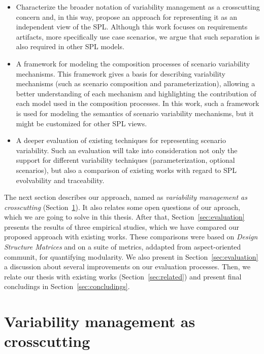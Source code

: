 \documentclass[times, 11pt,twocolumn]{article}
\begin{document}
\begin{itemize}
 \item Characterize the broader notation of variability management as
a crosscutting concern and, in this way, propose an approach for
representing it as an independent view of the SPL. Although
this work focuses on requirements artifacts, more specifically
use case scenarios, we argue that such separation is also required
in other SPL models.
 \item A framework for modeling the composition processes of scenario
variability mechanisms. This framework gives a basis for
describing variability mechanisms (such as scenario composition
and parameterization), allowing a better understanding of each mechanism and
highlighting the contribution of each model used in the composition processes.
In this work, such a framework is used for modeling the semantics of scenario variability mechanisms, but it
might be customized for other SPL views.
 \item A deeper evaluation of existing techniques for representing scenario
 variability. Such an evaluation will take into consideration not only the
 support for different variability techniques (parameterization, optional
 scenarios), but also a comparison of existing works with regard to
 SPL evolvability and traceability.  
\end{itemize}

The next section describes our approach, named as \emph{variability management
as crosscutting} (Section~\ref{sec:vmcc}). It also relates some open questions
of our aproach, which we are going to solve in this thesis. After that,
Section~\ref{sec:evaluation} presents the results of three empirical studies,
which we have compared our proposed approach with existing
works. These comparisons were based on \emph{Design Structure Matrices} and on a
suite of metrics, addapted from aspect-oriented communit, for quantifying modularity.
We also present in Section~\ref{sec:evaluation} a discussion about several
improvements on our evaluation processes. Then, we relate our
thesis with existing works (Section~\ref{sec:related}) and present final concludings 
in Section~\ref{sec:concludings}.

\section{Variability management as crosscutting}\label{sec:vmcc}
\end{document}
